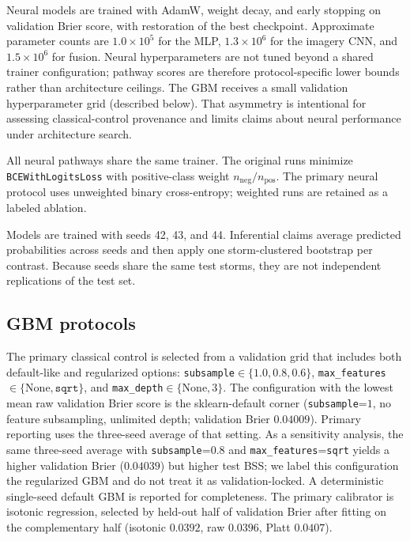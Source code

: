 \documentclass[11pt]{article}
\begin{document}
Neural models are trained with AdamW, weight decay, and early stopping on validation Brier score, with restoration of the best checkpoint. Approximate parameter counts are $1.0\times 10^5$ for the MLP, $1.3\times 10^6$ for the imagery CNN, and $1.5\times 10^6$ for fusion. Neural hyperparameters are not tuned beyond a shared trainer configuration; pathway scores are therefore protocol-specific lower bounds rather than architecture ceilings. The GBM receives a small validation hyperparameter grid (described below). That asymmetry is intentional for assessing classical-control provenance and limits claims about neural performance under architecture search.

All neural pathways share the same trainer. The original runs minimize \texttt{BCEWithLogitsLoss} with positive-class weight $n_{\mathrm{neg}}/n_{\mathrm{pos}}$. The primary neural protocol uses unweighted binary cross-entropy; weighted runs are retained as a labeled ablation.

Models are trained with seeds 42, 43, and 44. Inferential claims average predicted probabilities across seeds and then apply one storm-clustered bootstrap per contrast. Because seeds share the same test storms, they are not independent replications of the test set.

\subsection{GBM protocols}

The primary classical control is selected from a validation grid that includes both default-like and regularized options: \texttt{subsample}$\in\{1.0,0.8,0.6\}$, \texttt{max\_features}$\in\{\mathrm{None},\texttt{sqrt}\}$, and \texttt{max\_depth}$\in\{\mathrm{None},3\}$. The configuration with the lowest mean raw validation Brier score is the sklearn-default corner (\texttt{subsample}=$1$, no feature subsampling, unlimited depth; validation Brier $0.04009$). Primary reporting uses the three-seed average of that setting. As a sensitivity analysis, the same three-seed average with \texttt{subsample}=$0.8$ and \texttt{max\_features}=\texttt{sqrt} yields a higher validation Brier ($0.04039$) but higher test BSS; we label this configuration the regularized GBM and do not treat it as validation-locked. A deterministic single-seed default GBM is reported for completeness. The primary calibrator is isotonic regression, selected by held-out half of validation Brier after fitting on the complementary half (isotonic $0.0392$, raw $0.0396$, Platt $0.0407$).
\end{document}
